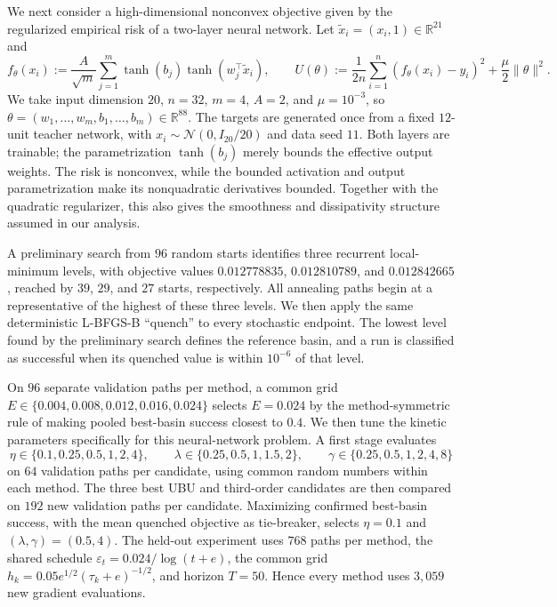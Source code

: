 \documentclass[11pt]{article}
\theoremstyle{definition}
\newcommand{\R}{\mathbb R}
\newcommand{\eps}{\varepsilon}
\begin{document}
We next consider a high-dimensional nonconvex objective given by the
regularized empirical risk of a two-layer neural network. Let
$\widetilde x_i=(x_i,1)\in\R^{21}$ and
\begin{equation}\label{eq:nnpotential}
 f_\theta(x_i):=\frac{A}{\sqrt m}\sum_{j=1}^m
 \tanh(b_j)\tanh\left(w_j^\top\widetilde x_i\right),\qquad
 U(\theta):=\frac{1}{2n}\sum_{i=1}^n(f_\theta(x_i)-y_i)^2
 +\frac{\mu}{2}\|\theta\|^2.
\end{equation}
We take input dimension $20$, $n=32$, $m=4$, $A=2$, and $\mu=10^{-3}$,
so $\theta=(w_1,\ldots,w_m,b_1,\ldots,b_m)\in\R^{88}$.  The targets are
generated once from a fixed $12$-unit teacher network, with
$x_i\sim\mathcal N(0,I_{20}/20)$ and data seed $11$.  Both layers are
trainable; the parametrization $\tanh(b_j)$ merely bounds the effective output
weights.  The risk is nonconvex, while the bounded activation and output
parametrization make its nonquadratic derivatives bounded.  Together with the
quadratic regularizer, this also gives the smoothness and dissipativity
structure assumed in our analysis.

A preliminary search from $96$ random starts identifies three recurrent
local-minimum levels, with
objective values $0.012778835$, $0.012810789$, and $0.012842665$, reached by
$39$, $29$, and $27$ starts, respectively.  All annealing paths begin at a
representative of the highest of these three levels.  We then apply the same
deterministic L-BFGS-B ``quench'' to every stochastic endpoint. The lowest
level found by the preliminary search defines the reference basin, and a run
is classified as successful when its quenched value is within $10^{-6}$ of
that level.

On $96$ separate validation paths per method, a common grid
$E\in\{0.004,0.008,0.012,0.016,0.024\}$ selects $E=0.024$ by the
method-symmetric rule of making pooled best-basin success closest to $0.4$.
We then tune the kinetic parameters specifically for this neural-network
problem.  A first stage evaluates
\[
 \eta\in\{0.1,0.25,0.5,1,2,4\},\qquad
 \lambda\in\{0.25,0.5,1,1.5,2\},\qquad
 \gamma\in\{0.25,0.5,1,2,4,8\}
\]
on $64$ validation paths per candidate, using common random numbers within
each method.  The three best UBU and third-order candidates are then compared
on $192$ new validation paths per candidate.  Maximizing confirmed best-basin
success, with the mean quenched objective as tie-breaker, selects
$\eta=0.1$ and $(\lambda,\gamma)=(0.5,4)$.
The held-out experiment uses $768$ paths per method, the shared schedule
$\eps_t=0.024/\log(t+e)$, the common grid
$h_k=0.05e^{1/2}(\tau_k+e)^{-1/2}$, and horizon $T=50$.  Hence every method
uses $3{,}059$ new gradient evaluations.
\end{document}
